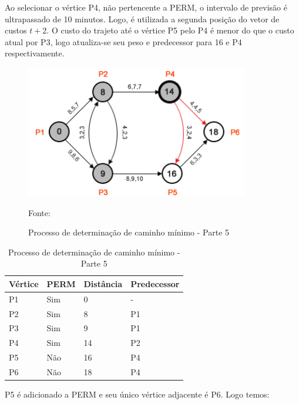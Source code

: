 Ao selecionar o vértice P4, não pertencente a PERM, o intervalo de previsão é ultrapassado
de 10 minutos. Logo, é utilizada a segunda posição do vetor de custos $t + 2$. O custo do trajeto até
o vértice P5 pelo P4 é menor do que o custo atual por P3, logo atualiza-se seu peso e predecessor
para 16 e P4 respectivamente.

\begin{figure}[htbp]
\centering
 \includegraphics[width=.50\textwidth]{chapters/fig/leo6.png}
\caption{Processo de determinação de caminho mínimo - Parte 5}
Fonte: \cite{leonard}
\label{fig:leo6}
\end{figure}
\FloatBarrier
\begin{table}[htbp]
	\centering
	\begin{tabular}{l l l l}
	\toprule
	Vértice & PERM & Distância & Predecessor\\
	\midrule
	P1 & Sim & 0 & - \\
	P2 & Sim & 8 & P1 \\
	P3 & Sim & 9 & P1 \\
	P4 & Sim & 14 & P2 \\
	P5 & Não & 16 & P4 \\
	P6 & Não & 18 & P4 \\
	\bottomrule
	\end{tabular}
\caption{Processo de determinação de caminho mínimo - Parte 5}
 \label{tab:leotab5}
\end{table}

P5 é adicionado a PERM e seu único vértice adjacente é P6. Logo temos:

